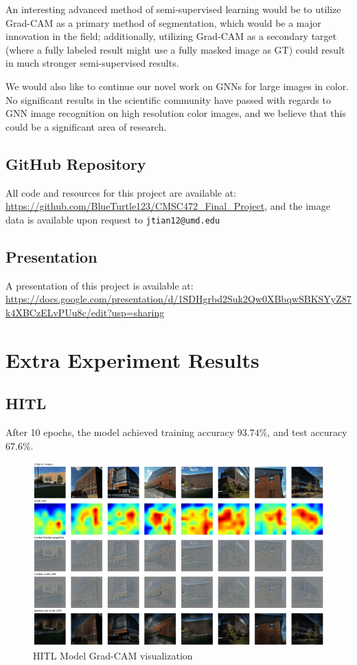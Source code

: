 \documentclass{article}
\begin{document}
An interesting advanced method of semi-supervised learning would be to utilize Grad-CAM as a primary method of segmentation, which would be a major innovation in the field; additionally, utilizing Grad-CAM as a secondary target (where a fully labeled result might use a fully masked image as GT) could result in much stronger semi-supervised results.

We would also like to continue our novel work on GNNs for large images in color. No significant results in the scientific community have passed with regards to GNN image recognition on high resolution color images, and we believe that this could be a significant area of research.

\subsection*{GitHub Repository}

All code and resources for this project are available at: \url{https://github.com/BlueTurtle123/CMSC472_Final_Project}, and the image data is available upon request to \verb*|jtian12@umd.edu|

\subsection*{Presentation}

A presentation of this project is available at: \url{https://docs.google.com/presentation/d/1SDHgrbd2Suk2Qw0XBbqwSBKSYyZ87k4XBCzELvPUu8c/edit?usp=sharing}

\newpage 
\appendix

\section{Extra Experiment Results}
\label{experiment_results}

\subsection{HITL}

After 10 epochs, the model achieved training accuracy $93.74\%$, and test accuracy $67.6\%$. 

\begin{figure}[H]
    \centering
    \includegraphics[width=0.8\linewidth]{hitl.png}
    \caption{HITL Model Grad-CAM visualization}
    \label{fig:hitl_results}
\end{figure}
\end{document}
